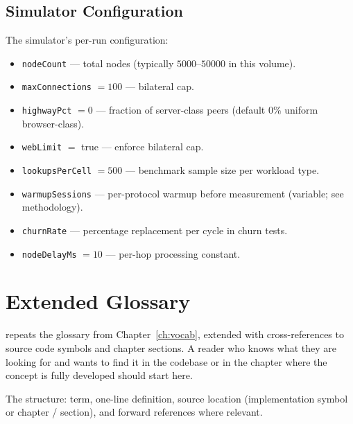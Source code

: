 \documentclass[twoside,nobib]{tufte-book}
\begin{document}
\section{Simulator Configuration}

The simulator's per-run configuration:

\begin{itemize}\setlength\itemsep{0.1em}
  \item \texttt{nodeCount} --- total nodes (typically
    $5000$--$50000$ in this volume).
  \item \texttt{maxConnections} $= 100$ --- bilateral cap.
  \item \texttt{highwayPct} $= 0$ --- fraction of
    server-class peers (default $0\%$ uniform browser-class).
  \item \texttt{webLimit} $=$ true --- enforce bilateral cap.
  \item \texttt{lookupsPerCell} $= 500$ --- benchmark sample
    size per workload type.
  \item \texttt{warmupSessions} --- per-protocol warmup before
    measurement (variable; see methodology).
  \item \texttt{churnRate} --- percentage replacement per
    cycle in churn tests.
  \item \texttt{nodeDelayMs} $= 10$ --- per-hop processing
    constant.
\end{itemize}


\chapter{Extended Glossary}
\label{app:glossary}

 repeats the glossary from
Chapter~\ref{ch:vocab}, extended with cross-references to source
code symbols and chapter sections. A reader who knows what they
are looking for and wants to find it in the codebase or in the
chapter where the concept is fully developed should start here.

The structure: term, one-line definition, source location
(implementation symbol or chapter / section), and forward
references where relevant.
\end{document}
